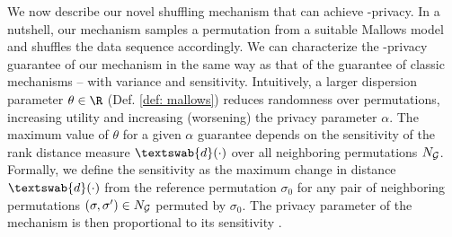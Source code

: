 We now describe our novel shuffling mechanism that can achieve \name-privacy. In a nutshell, our mechanism samples a permutation from a suitable Mallows model and shuffles the data sequence accordingly. We can characterize the \name-privacy guarantee of our mechanism in the same way as that of the \DP guarantee of classic mechanisms \citep{Dwork} -- with variance and sensitivity. Intuitively, a larger dispersion parameter $\theta \in \R$ (Def. \ref{def: mallows}) reduces randomness over permutations, increasing utility and increasing (worsening) the privacy parameter $\alpha$. The maximum value of $\theta$ for a given $\alpha$ guarantee depends on the sensitivity of the rank distance measure $\textswab{d}(\cdot)$ over all neighboring permutations $N_{\mathcal{G}}$. Formally, we define the sensitivity as 
  the maximum change in distance $\textswab{d}(\cdot)$ from the reference permutation $\sigma_0$ for any pair of neighboring permutations $(\sigma,\sigma') \in N_{\mathcal{G}}$ permuted by $\sigma_0$. The privacy parameter of the mechanism is then proportional to its sensitivity . 
  

